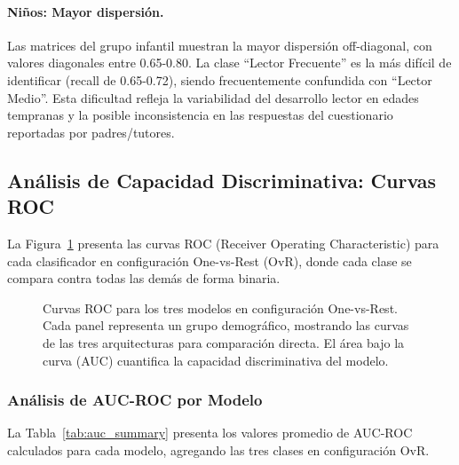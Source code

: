 \documentclass[12pt,a4paper]{article}
\begin{document}
\paragraph{Niños: Mayor dispersión.} Las matrices del grupo infantil muestran la mayor dispersión off-diagonal, con valores diagonales entre 0.65-0.80. La clase ``Lector Frecuente'' es la más difícil de identificar (recall de 0.65-0.72), siendo frecuentemente confundida con ``Lector Medio''. Esta dificultad refleja la variabilidad del desarrollo lector en edades tempranas y la posible inconsistencia en las respuestas del cuestionario reportadas por padres/tutores.


\subsection{Análisis de Capacidad Discriminativa: Curvas ROC}

La Figura~\ref{fig:roc_curves} presenta las curvas ROC (Receiver Operating Characteristic) para cada clasificador en configuración One-vs-Rest (OvR), donde cada clase se compara contra todas las demás de forma binaria.

\begin{figure}[H]
\centering
{}
\caption{Curvas ROC para los tres modelos en configuración One-vs-Rest. Cada panel representa un grupo demográfico, mostrando las curvas de las tres arquitecturas para comparación directa. El área bajo la curva (AUC) cuantifica la capacidad discriminativa del modelo.}
\label{fig:roc_curves}
\end{figure}

\subsubsection{Análisis de AUC-ROC por Modelo}

La Tabla~\ref{tab:auc_summary} presenta los valores promedio de AUC-ROC calculados para cada modelo, agregando las tres clases en configuración OvR.
\end{document}
